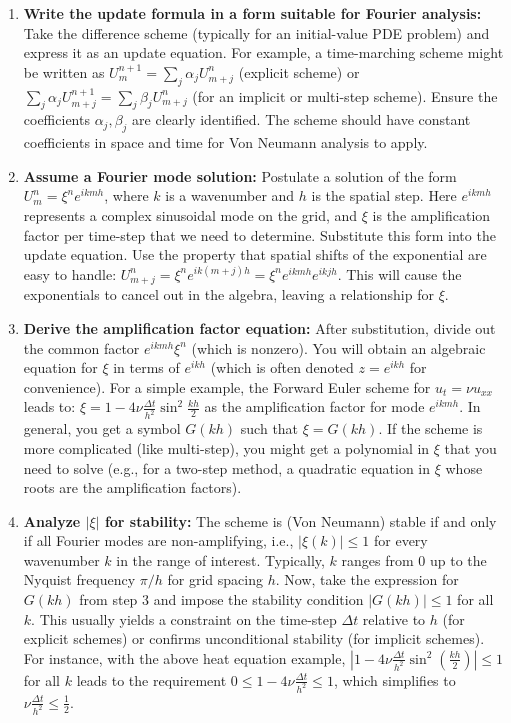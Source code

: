 \documentclass[a4paper,11pt]{article}
\begin{document}
\begin{enumerate}
    \item \textbf{Write the update formula in a form suitable for Fourier analysis:} Take the difference scheme (typically for an initial-value PDE problem) and express it as an update equation. For example, a time-marching scheme might be written as $U^{n+1}_m = \sum_j \alpha_j U^n_{m+j}$ (explicit scheme) or $\sum_j \alpha_j U^{n+1}_{m+j} = \sum_j \beta_j U^n_{m+j}$ (for an implicit or multi-step scheme). Ensure the coefficients $\alpha_j, \beta_j$ are clearly identified. The scheme should have constant coefficients in space and time for Von Neumann analysis to apply.

    \item \textbf{Assume a Fourier mode solution:} Postulate a solution of the form $U^n_m = \xi^n e^{ikmh}$, where $k$ is a wavenumber and $h$ is the spatial step. Here $e^{ikmh}$ represents a complex sinusoidal mode on the grid, and $\xi$ is the amplification factor per time-step that we need to determine. Substitute this form into the update equation. Use the property that spatial shifts of the exponential are easy to handle: $U^n_{m+j} = \xi^n e^{ik(m+j)h} = \xi^n e^{ikmh} e^{ikjh}$. This will cause the exponentials to cancel out in the algebra, leaving a relationship for $\xi$.

    \item \textbf{Derive the amplification factor equation:} After substitution, divide out the common factor $e^{ikmh}\xi^n$ (which is nonzero). You will obtain an algebraic equation for $\xi$ in terms of $e^{ikh}$ (which is often denoted $z = e^{ikh}$ for convenience). For a simple example, the Forward Euler scheme for $u_t = \nu u_{xx}$ leads to: $\xi = 1 - 4\nu \frac{\Delta t}{h^2}\sin^2\frac{kh}{2}$ as the amplification factor for mode $e^{ikmh}$. In general, you get a symbol $G(kh)$ such that $\xi = G(kh)$. If the scheme is more complicated (like multi-step), you might get a polynomial in $\xi$ that you need to solve (e.g., for a two-step method, a quadratic equation in $\xi$ whose roots are the amplification factors).

    \item \textbf{Analyze $|\xi|$ for stability:} The scheme is (Von Neumann) stable if and only if all Fourier modes are non-amplifying, i.e., $|\xi(k)| \le 1$ for every wavenumber $k$ in the range of interest. Typically, $k$ ranges from $0$ up to the Nyquist frequency $\pi/h$ for grid spacing $h$. Now, take the expression for $G(kh)$ from step 3 and impose the stability condition $|G(kh)| \le 1$ for all $k$. This usually yields a constraint on the time-step $\Delta t$ relative to $h$ (for explicit schemes) or confirms unconditional stability (for implicit schemes). For instance, with the above heat equation example, $|1 - 4\nu \frac{\Delta t}{h^2}\sin^2(\frac{kh}{2})| \le 1$ for all $k$ leads to the requirement $0 \le 1 - 4\nu \frac{\Delta t}{h^2} \le 1$, which simplifies to $\nu \frac{\Delta t}{h^2} \le \frac{1}{2}$.


\end{enumerate}
\end{document}
